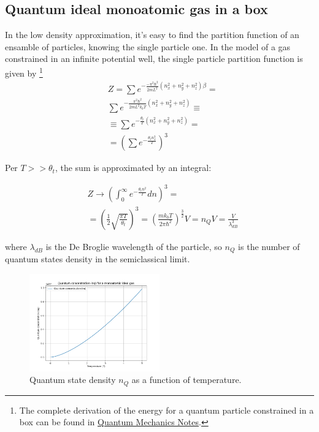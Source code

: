 \documentclass{article}
\begin{document}
\subsection{Quantum ideal monoatomic gas in a box}

In the low density approximation, it's easy to find the partition function of an ensamble of particles,
knowing the single particle one.
In the model of a gas constrained in an infinite potential well, the single particle partition function is given by
\footnote{
    The complete derivation of the energy for a quantum particle constrained in a box can be found in
    \href{https://cesaresabattini.github.io/Physics-Lecture-Notes/}{Quantum Mechanics Notes}.
}
\begin{equation}
    \begin{aligned}
         & Z=\sum e^{-\frac{-\pi^2\hbar^2}{2mL^2}(n_x^2+n_y^2+n_z^2)\beta}=  \\
         & \sum e^{-\frac{\pi^2\hbar^2}{2mL^2k_bT}(n_x^2+n_y^2+n_z^2)}\equiv \\
         & \equiv\sum e^{-\frac{\theta_t}{T}(n_x^2+n_y^2+n_z^2)}=            \\
         & =\left(\sum e^{-\frac{\theta_tn_x^3}{T}}\right)^3
    \end{aligned}
\end{equation}

Per $T>>\theta_t$, the sum is approximated by an integral:

\begin{equation}
    \begin{aligned}
         & Z \rightarrow \left(\int_{0}^{\infty} e^{-\frac{\theta_tn^2}{T}}dn\right)^3=                                                                    \\
         & =\left(\frac{1}{2}\sqrt{\frac{\pi T}{\theta_t}}\right)^3= \left(\frac{mk_bT}{2\pi\hbar^2}\right)^{\frac{3}{2}}V= n_QV= \frac{V}{\lambda_{dB}^3}
    \end{aligned}
\end{equation}

where $\lambda_{dB}$ is the De Broglie wavelength of the particle, so $n_Q$ is the number of quantum states density in the semiclassical limit.

\begin{figure}[h]
    \centering
    \includegraphics[width=0.5\textwidth]{images/nq-monoatomic-ideal-gas.png}
    \caption{Quantum state density $n_Q$ as a function of temperature.}
    \label{fig:nq}
\end{figure}
\end{document}
